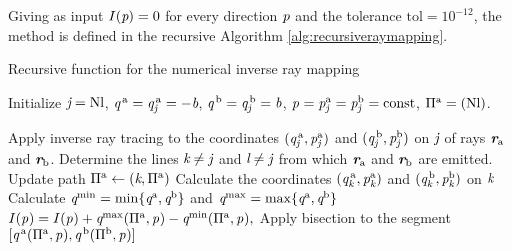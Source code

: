 Giving as input $I(\textit{p})=0$ for every direction $\textit{p}$ and the tolerance $\textrm{tol}=10^{-12}$,
the method is defined in the recursive Algorithm \ref{alg:recursiveraymapping}.
\begin{algorithm}
\caption{Recursive function for the numerical inverse ray mapping}\label{alg:recursiveraymapping}
Initialize $\textit{j} = \textrm{Nl}$, $\textit{q}^{\,\textrm{a}}= \textit{q}^{\,\textrm{a}}_{\textit{j}}=-\textit{b}$, $\textit{q}^{\,\textrm{b}}= \textit{q}^{\,\textrm{b}}_{\textit{j}}=\textit{b}$, $\textit{p}_{\textrm{} \textit{}}=\textit{p}^{\textrm{a}}_{\textit{j}}=\textit{p}^{\textrm{b}}_{\textit{j}}=\textrm{const}$, $\Pi^{\textrm{a}}=({\textrm{Nl}})$.
\begin{algorithmic}[1]
\State Apply inverse ray tracing to the coordinates $(\textit{q}^{\,\textrm{a}}_{\textit{j}},\textit{p}^{\textrm{a}}_{\textit{j}})$ and $(\textit{q}^{\,\textrm{b}}_{\textit{j}},\textit{p}^{\textrm{b}}_{\textit{j}})$ on $\textit{j}$ of rays $\textit{\textbf{r}}_{\textrm{a}}$ and $\textit{\textbf{r}}_{\textrm{b}}$.
\State Determine the lines $\textit{k}\neq\textit{j}$ and $\textit{l}\neq\textit{j}$ from which $\textit{\textbf{r}}_{\textrm{a}}$ and $\textit{\textbf{r}}_{\textrm{b}}$ are emitted.
\State Update path $\Pi^{\textrm{a}}\gets(\textit{k}, \Pi^{\textrm{a}})$
\State Calculate the coordinates $(\textit{q}^{\,\textrm{a}}_{\textit{k}},\textit{p}^{\textrm{a}}_{\textit{k}})$ and $(\textit{q}^{\,\textrm{b}}_{\textit{k}}, \textit{p}^{\textrm{b}}_{\textit{k}})$ on $\textit{k}$
\If {$\lineaj = \lineak$}
\State{}
\Else  \State Calculate
$\textit{q}^{\textrm{min}} = \min\{\textit{q}^{\textrm{a}}, \textit{q}^{\textrm{b}}\}$ and $\textit{q}^{\textrm{max}} = \max\{\textit{q}^{\textrm{a}}, \textit{q}^{\textrm{b}}\}$
\State $I(\textit{p}_{\textrm{} \textit{}}) = I(\textit{p}_{\textrm{} \textit{}})+\textit{q}^{\textrm{max}}(\Pi^{\textrm{a}}, \textit{p}_{\textrm{} \textit{}})
-\textit{q}^{\textrm{min}}(\Pi^{\textrm{a}}, \textit{p}_{\textrm{} \textit{}}),$
\EndIf
\Else 
\State Apply bisection to the segment $[\textit{q}^{\,\textrm{a}}(\Pi^\textrm{a}, \textit{p}_{\textrm{} \textit{}}), \textit{q}^{\,\textrm{b}}(\Pi^\textrm{b}, \textit{p}_{\textrm{} \textit{}})]$

\end{algorithmic}
\end{algorithm}
